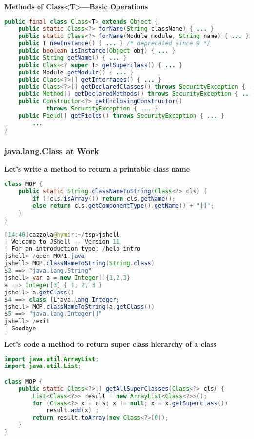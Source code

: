 \textbf{Methods of Class<T>—Basic Operations}

\begin{lstlisting}[language=Java]
public final class Class<T> extends Object {
	public static Class<?> forName(String className) { ... }
	public static Class<?> forName(Module module, String name) { ... }
	public T newInstance() { ... } /* deprecated since 9 */
	public boolean isInstance(Object obj) { ... }
	public String getName() { ... }
	public Class<? super T> getSuperclass() { ... }
	public Module getModule() { ... }
	public Class<?>[] getInterfaces() { ... }
	public Class<?>[] getDeclaredClasses() throws SecurityException { ... }
	public Method[] getDeclaredMethods() throws SecurityException { ... }
	public Constructor<?> getEnclosingConstructor()
			throws SecurityException { ... }
	public Field[] getFields() throws SecurityException { ... }
		...
}
\end{lstlisting}

\subsubsection{java.lang.Class at Work}

\textbf{Let's write a method to return a printable class name}

\begin{lstlisting}[language=Java]
class MOP {
	public static String classNameToString(Class<?> cls) {
		if (!cls.isArray()) return cls.getName();
		else return cls.getComponentType().getName() + "[]";
	}
}
\end{lstlisting}

\begin{lstlisting}[language=Java]
[14:40]cazzola@hymir:~/tsp>jshell
| Welcome to JShell -- Version 11
| For an introduction type: /help intro
jshell> /open MOP1.java
jshell> MOP.classNameToString(String.class)
$2 ==> "java.lang.String"
jshell> var a = new Integer[]{1,2,3}
a ==> Integer[3] { 1, 2, 3 }
jshell> a.getClass()
$4 ==> class [Ljava.lang.Integer;
jshell> MOP.classNameToString(a.getClass())
$5 ==> "java.lang.Integer[]"
jshell> /exit
| Goodbye
\end{lstlisting}

\textbf{Let’s code a method to return super class hierarchy of a class}

\begin{lstlisting}[language=Java]
import java.util.ArrayList;
import java.util.List;

class MOP {
	public static Class<?>[] getAllSuperClasses(Class<?> cls) {
		List<Class<?>> result = new ArrayList<Class<?>>();
		for (Class<?> x = cls; x != null; x = x.getSuperclass())
			result.add(x) ;
		return result.toArray(new Class<?>[0]);
	}
}
\end{lstlisting}

